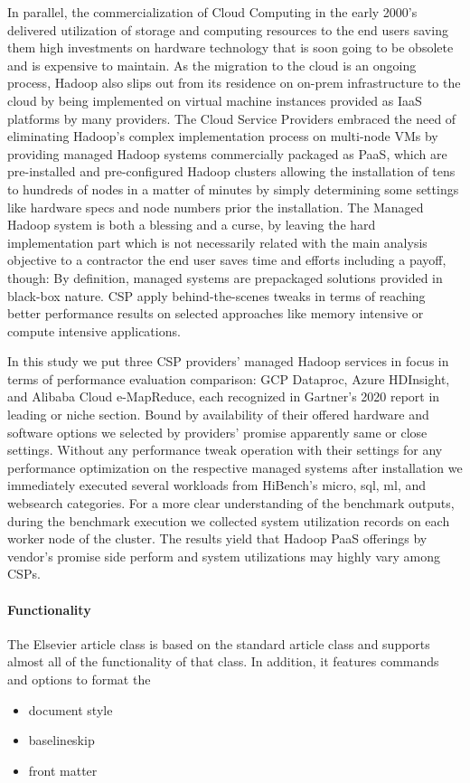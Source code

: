 \documentclass[review]{elsarticle}
\begin{document}
In parallel, the commercialization of Cloud Computing in the early 2000's delivered utilization of storage and computing resources to the end users saving them high investments on hardware technology that is soon going to be obsolete and is expensive to maintain. As the migration to the cloud is an ongoing process, Hadoop also slips out from its residence on on-prem infrastructure to the cloud by being implemented on virtual machine instances provided as IaaS platforms by many providers. The Cloud Service Providers embraced the need of eliminating Hadoop's complex implementation process on multi-node VMs by providing managed Hadoop systems commercially packaged as PaaS, which are pre-installed and pre-configured Hadoop clusters allowing the installation of tens to hundreds of nodes in a matter of minutes by simply determining some settings like hardware specs and node numbers prior the installation. The Managed Hadoop system is both a blessing and a curse, by leaving the hard implementation part which is not necessarily related with the main analysis objective to a contractor the end user saves time and efforts including a payoff, though: By definition, managed systems are prepackaged solutions provided in black-box nature. CSP apply behind-the-scenes tweaks in terms of reaching better performance results on selected approaches like memory intensive or compute intensive applications.

In this study we put three CSP providers' managed Hadoop services in focus in terms of performance evaluation comparison: GCP Dataproc, Azure HDInsight, and Alibaba Cloud e-MapReduce, each recognized in Gartner's 2020 report in leading or niche section. Bound by availability of their offered hardware and software options we selected by providers' promise apparently same or close settings. Without any performance tweak operation with their settings for any performance optimization on the respective managed systems after installation we immediately executed several workloads from HiBench's micro, sql, ml, and websearch categories. For a more clear understanding of the benchmark outputs, during the benchmark execution we collected system utilization records on each worker node of the cluster. The results yield that Hadoop PaaS offerings by vendor's promise side perform and system utilizations may highly vary among CSPs.


\paragraph{Functionality} The Elsevier article class is based on the standard article class and supports almost all of the functionality of that class. In addition, it features commands and options to format the
\begin{itemize}
\item document style
\item baselineskip
\item front matter
\end{itemize}
\end{document}
